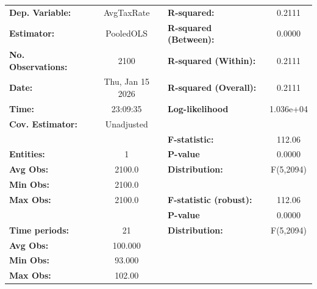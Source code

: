 \begin{center}
\begin{tabular}{lclc}
\toprule
\textbf{Dep. Variable:}                    &     AvgTaxRate     & \textbf{  R-squared:         }   &      0.2111      \\
\textbf{Estimator:}                        &     PooledOLS      & \textbf{  R-squared (Between):}  &      0.0000      \\
\textbf{No. Observations:}                 &        2100        & \textbf{  R-squared (Within):}   &      0.2111      \\
\textbf{Date:}                             &  Thu, Jan 15 2026  & \textbf{  R-squared (Overall):}  &      0.2111      \\
\textbf{Time:}                             &      23:09:35      & \textbf{  Log-likelihood     }   &    1.036e+04     \\
\textbf{Cov. Estimator:}                   &     Unadjusted     & \textbf{                     }   &                  \\
\textbf{}                                  &                    & \textbf{  F-statistic:       }   &      112.06      \\
\textbf{Entities:}                         &         1          & \textbf{  P-value            }   &      0.0000      \\
\textbf{Avg Obs:}                          &       2100.0       & \textbf{  Distribution:      }   &    F(5,2094)     \\
\textbf{Min Obs:}                          &       2100.0       & \textbf{                     }   &                  \\
\textbf{Max Obs:}                          &       2100.0       & \textbf{  F-statistic (robust):} &      112.06      \\
\textbf{}                                  &                    & \textbf{  P-value            }   &      0.0000      \\
\textbf{Time periods:}                     &         21         & \textbf{  Distribution:      }   &    F(5,2094)     \\
\textbf{Avg Obs:}                          &      100.000       & \textbf{                     }   &                  \\
\textbf{Min Obs:}                          &       93.000       & \textbf{                     }   &                  \\
\textbf{Max Obs:}                          &       102.00       & \textbf{                     }   &                  \\

\end{tabular}
\end{center}
